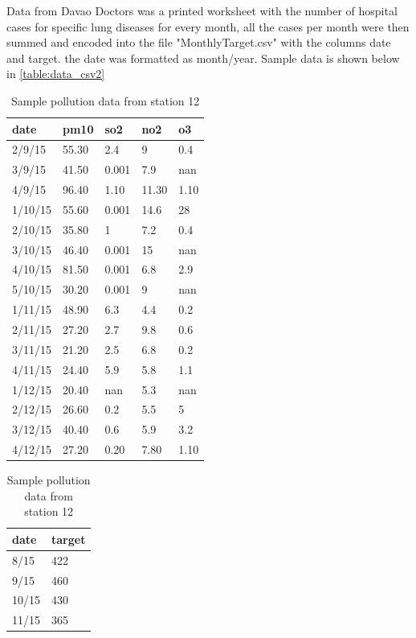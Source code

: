 \documentclass[10pt,11pt,12pt,oneside]{book}
\begin{document}
Data from Davao Doctors was a printed worksheet with the number of hospital cases for specific lung diseases for every month, all the cases per month were then summed and encoded into the file "MonthlyTarget.csv" with the columns date and target. the date was formatted as month/year. Sample data is shown below in \ref{table:data_csv2}\\
\begin{table}[H]
\parbox{.45\linewidth}{
\centering
\begin{tabular}{|l|l|l|l|l|}
\toprule
date    & pm10  & so2   & no2   & o3    \\
\hline
2/9/15  & 55.30 & 2.4   & 9     & 0.4   \\
\hline
3/9/15  & 41.50 & 0.001 & 7.9   & nan   \\
\hline
4/9/15  & 96.40 & 1.10  & 11.30 & 1.10  \\
\hline
1/10/15 & 55.60 & 0.001 & 14.6  & 28    \\
\hline
2/10/15 & 35.80 & 1     & 7.2   & 0.4   \\
\hline
3/10/15 & 46.40 & 0.001 & 15    & nan   \\
\hline
4/10/15 & 81.50 & 0.001 & 6.8   & 2.9   \\
\hline
5/10/15 & 30.20 & 0.001 & 9     & nan   \\
\hline
1/11/15 & 48.90 & 6.3   & 4.4   & 0.2   \\
\hline
2/11/15 & 27.20 & 2.7   & 9.8   & 0.6   \\
\hline
3/11/15 & 21.20 & 2.5   & 6.8   & 0.2   \\
\hline
4/11/15 & 24.40 & 5.9   & 5.8   & 1.1   \\
\hline
1/12/15 & 20.40 & nan   & 5.3   & nan   \\
\hline
2/12/15 & 26.60 & 0.2   & 5.5   & 5     \\
\hline
3/12/15 & 40.40 & 0.6   & 5.9   & 3.2   \\
\hline
4/12/15 & 27.20 & 0.20  & 7.80  & 1.10  \\
\bottomrule
\end{tabular}
\caption{Sample pollution data from station 12}
\label{table:data_csv1}
}
\hfill
\parbox{.45\linewidth}{
\centering
\begin{tabular}{|l|l|}
\toprule
date  & target  \\
\hline
8/15  & 422     \\
\hline
9/15  & 460     \\
\hline
10/15 & 430     \\
\hline
11/15 & 365     \\

\end{tabular}}
\end{table}
\end{document}
